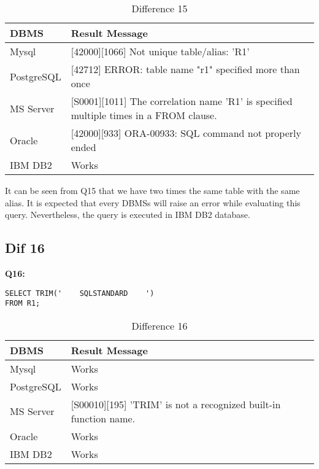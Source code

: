 \begin{table}[h]
\centering
\caption{Difference 15}
\label{my-label}
\begin{tabular}{|p{2cm}|p{11.5cm}| }
\hline
\textbf{DBMS} & \textbf{Result Message}                                                                       \\ \hline
Mysql         & {[}42000{]}{[}1066{]} Not unique table/alias: 'R1'                                            \\ \hline
PostgreSQL    & {[}42712{]} ERROR: table name "r1" specified more than once                                   \\ \hline
MS Server     & {[}S0001{]}{[}1011{]} The correlation name 'R1' is specified multiple times in a FROM clause. \\ \hline
Oracle        & {[}42000{]}{[}933{]} ORA-00933: SQL command not properly ended                                \\ \hline
IBM DB2       & Works                                                                                         \\ \hline
\end{tabular}
\end{table}

It can be seen from Q15 that we have two times the same table with the same alias. It is expected that every DBMSs will raise an error while evaluating this query. Nevertheless, the query is executed in IBM DB2 database. 

\subsection{Dif 16}

\textbf{Q16:}
\begin{mdframed}[backgroundcolor=lightgray!20]
\begin{lstlisting}[style=SQL]
SELECT TRIM('    SQLSTANDARD    ')
FROM R1;
\end{lstlisting}
\end{mdframed}

\begin{table}[h]
\centering
\caption{Difference 16}
\label{my-label}
\begin{tabular}{|p{2cm}|p{11.5cm}| }
\hline
\textbf{DBMS} & \textbf{Result Message}                                                  \\ \hline
Mysql         & Works                                                                    \\ \hline
PostgreSQL    & Works                                                                    \\ \hline
MS Server     & {[}S00010{]}{[}195{]} 'TRIM' is not a recognized built-in function name. \\ \hline
Oracle        & Works                                                                    \\ \hline
IBM DB2       & Works                                                                    \\ \hline
\end{tabular}
\end{table}

